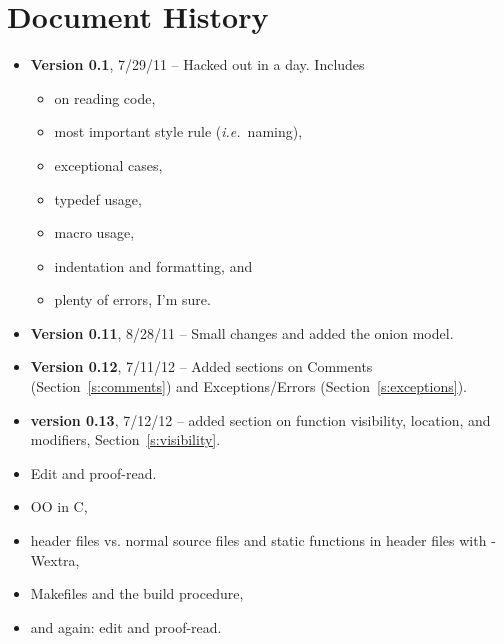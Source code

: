 \documentclass[11pt,onecolumn]{article}
\def\composite{\textsc{Composite}}
\def\ie{\textit{i.e.}}
\newcommand{\head}[1]{\vspace{0.4em}\noindent{\bf #1}}
\newcommand{\lsthead}[1]{{\bf #1}}
\begin{document}





\section{Document History}
\label{s:hist}

\begin{itemize}
\item \lsthead{Version 0.1}, 7/29/11 -- Hacked out in a day.  Includes
\begin{itemize}[itemsep=0pt,topsep=1pt,parsep=1pt,leftmargin=2.5em]
\item on reading code,
\item most important style rule (\ie\ naming),
\item exceptional cases,
\item typedef usage,
\item macro usage,
\item indentation and formatting, and
\item plenty of errors, I'm sure.
\end{itemize}
\item \lsthead{Version 0.11}, 8/28/11 -- Small changes and added the
  onion model.
\item \lsthead{Version 0.12}, 7/11/12 -- Added sections on Comments
  (Section~\ref{s:comments}) and Exceptions/Errors
  (Section~\ref{s:exceptions}).
\item \lsthead{version 0.13}, 7/12/12 -- added section on function
  visibility, location, and modifiers, Section~\ref{s:visibility}.
\end{itemize}

\head{TODO}
\begin{itemize}[itemsep=0pt,topsep=1pt,parsep=1pt,leftmargin=2.5em]
\item Edit and proof-read.
\item OO in C,
\item header files vs. normal source files and static functions in
  header files with -Wextra,
\item Makefiles and the build procedure, 
\item and again: edit and proof-read.
\end{itemize}
\end{document}
